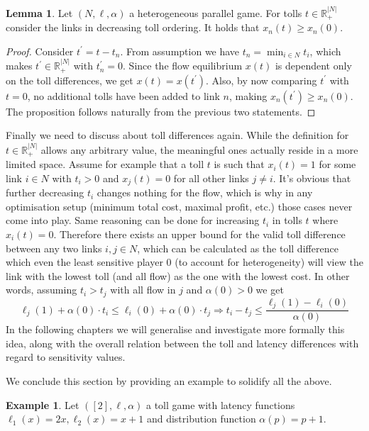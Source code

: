 \documentclass[10pt,a4paper]{book}
\newcommand{\R}{\mathbb{R}}
\theoremstyle{definition}
\newtheorem{lemma}[definition]{Lemma}
\theoremstyle{comment}
\newtheorem{example}[definition]{Example}
\begin{document}
\begin{lemma}
	\label{lemma:xn_xn0_lower_bound}
	Let $(N, \ell, \alpha)$ a heterogeneous parallel game.
	For tolls $t \in \R_+^{|N|}$ consider the links in decreasing toll ordering.
	It holds that $x_n(t) \ge x_n(0)$.
\end{lemma}

\begin{proof}
	Consider $t^\prime = t - t_n$.
	From assumption we have $t_n = \min_{i \in N} t_i$, which makes $t^\prime \in \R_+^{|N|}$ with $t_n^\prime = 0$.
	Since the flow equilibrium $x(t)$ is dependent only on the toll differences, we get $x(t) = x(t^\prime)$.
	Also, by now comparing $t^\prime$ with $t = 0$, no additional tolls have been added to link $n$, making $x_n(t^\prime) \ge x_n(0)$.
	The proposition follows naturally from the previous two statements.
\end{proof}

Finally we need to discuss about toll differences again.
While the definition for $t \in \R_+^{|N|}$ allows any arbitrary value, the meaningful ones actually reside in a more limited space.
Assume for example that a toll $t$ is such that $x_i(t) = 1$ for some link $i \in N$ with $t_i > 0$ and $x_j(t) = 0$ for all other links $j \ne i$.
It's obvious that further decreasing $t_i$ changes nothing for the flow, which is why in any optimisation setup (minimum total cost, maximal profit, etc.) those cases never come into play. Same reasoning can be done for increasing $t_i$ in tolls $t$ where $x_i(t) = 0$.
Therefore there exists an upper bound for the valid toll difference between any two links $i, j \in N$, which can be calculated as the toll difference which even the least sensitive player $0$ (to account for heterogeneity) will view the link with the lowest toll (and all flow) as the one with the lowest cost.
In other words, assuming $t_i > t_j$ with all flow in $j$ and $\alpha(0) > 0$ we get
\[\ell_j(1) + \alpha(0) \cdot t_i \le \ell_i(0) + \alpha(0) \cdot t_j \Rightarrow t_i - t_j \le \frac{\ell_j(1) - \ell_i(0)}{\alpha(0)}\]
In the following chapters we will generalise and investigate more formally this idea, along with the overall relation between the toll and latency differences with regard to sensitivity values.

We conclude this section by providing an example to solidify all the above.

\begin{example}
	\label{example:simple_alpha}
	Let $([2], \ell, \alpha)$ a toll game with latency functions $\ell_1(x) = 2x, \ell_2(x) = x + 1$ and distribution function $\alpha(p) = p + 1$.
\end{example}
\end{document}
